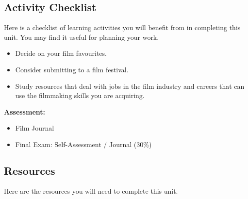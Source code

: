 \documentclass[
]{book}
\providecommand{\tightlist}{%
  \setlength{\itemsep}{0pt}\setlength{\parskip}{0pt}}
\begin{document}
\hypertarget{activity-checklist-9}{%
\subsection*{Activity Checklist}\label{activity-checklist-9}}

\begin{reflect}
Here is a checklist of learning activities you will benefit from in completing this unit. You may find it useful for planning your work.

\begin{itemize}
\tightlist
\item
  Decide on your film favourites.\\
\item
  Consider submitting to a film festival.\\
\item
  Study resources that deal with jobs in the film industry and careers that can use the filmmaking skills you are acquiring.
\end{itemize}

\textbf{Assessment:}

\begin{itemize}
\tightlist
\item
  Film Journal\\
\item
  Final Exam: Self-Assessment / Journal (30\%)
\end{itemize}
\end{reflect}

\hypertarget{resources-9}{%
\subsection*{Resources}\label{resources-9}}

Here are the resources you will need to complete this unit.
\end{document}
